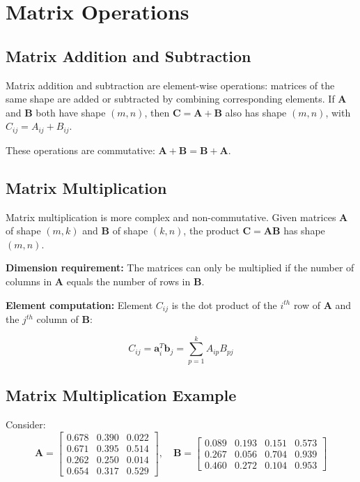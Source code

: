 \documentclass{book}
\begin{document}
\section{Matrix Operations}

\subsection{Matrix Addition and Subtraction}

Matrix addition and subtraction are element-wise operations: matrices of the same shape are added or subtracted by combining corresponding elements. If $\mathbf{A}$ and $\mathbf{B}$ both have shape $(m, n)$, then $\mathbf{C} = \mathbf{A} + \mathbf{B}$ also has shape $(m, n)$, with $C_{ij} = A_{ij} + B_{ij}$.

These operations are commutative: $\mathbf{A} + \mathbf{B} = \mathbf{B} + \mathbf{A}$.

\subsection{Matrix Multiplication}

Matrix multiplication is more complex and non-commutative. Given matrices $\mathbf{A}$ of shape $(m, k)$ and $\mathbf{B}$ of shape $(k, n)$, the product $\mathbf{C} = \mathbf{AB}$ has shape $(m, n)$.

\textbf{Dimension requirement:} The matrices can only be multiplied if the number of columns in $\mathbf{A}$ equals the number of rows in $\mathbf{B}$.

\textbf{Element computation:} Element $C_{ij}$ is the dot product of the $i^{th}$ row of $\mathbf{A}$ and the $j^{th}$ column of $\mathbf{B}$:

\begin{equation}
C_{ij} = \mathbf{a}_i^T \mathbf{b}_j = \sum_{p=1}^{k} A_{ip} B_{pj}
\end{equation}

\subsection{Matrix Multiplication Example}

Consider:
\begin{equation}
\mathbf{A} = \begin{bmatrix}
0.678 & 0.390 & 0.022 \\
0.671 & 0.395 & 0.514 \\
0.262 & 0.250 & 0.014 \\
0.654 & 0.317 & 0.529
\end{bmatrix}, \quad
\mathbf{B} = \begin{bmatrix}
0.089 & 0.193 & 0.151 & 0.573 \\
0.267 & 0.056 & 0.704 & 0.939 \\
0.460 & 0.272 & 0.104 & 0.953
\end{bmatrix}
\end{equation}
\end{document}
